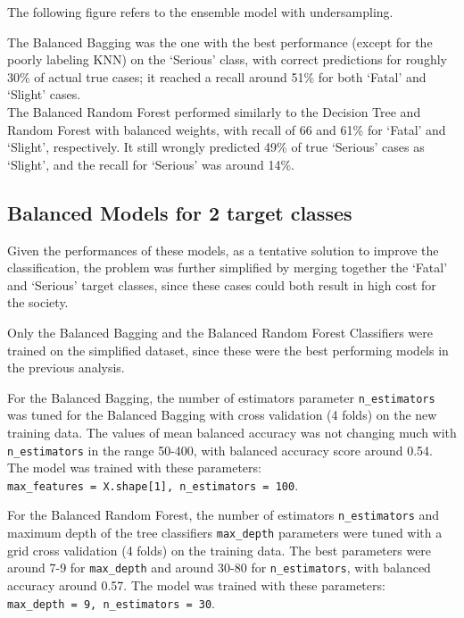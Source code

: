 \documentclass[11pt]{article}
\begin{document}
The following figure refers to the ensemble model with undersampling.

    \begin{center}
    \end{center}

The Balanced Bagging was the one with the best performance (except for the poorly labeling KNN) on the `Serious' class, with correct predictions for roughly 30\% of actual true cases; it reached a recall around 51\% for both `Fatal' and `Slight' cases.\\
The Balanced Random Forest performed similarly to the Decision Tree and Random Forest with balanced weights, with recall of 66 and 61\% for `Fatal' and `Slight', respectively. It still wrongly predicted 49\% of true `Serious' cases as `Slight', and the recall for `Serious' was around 14\%.

    \hypertarget{balanced-models-for-2-target-classes}{%
\subsection{Balanced Models for 2 target classes}\label{balanced-models-for-2-target-classes}}

Given the performances of these models, as a tentative solution to improve the classification, the problem was further simplified by merging together the `Fatal' and `Serious' target classes, since these cases could both result in high cost for the society.

Only the Balanced Bagging and the Balanced Random Forest Classifiers were trained on the simplified dataset, since these were the best performing models in the previous analysis.

For the Balanced Bagging, the number of estimators parameter \texttt{n\_estimators} was tuned for the Balanced Bagging with cross validation (4 folds) on the new training data. The values of mean balanced accuracy was not changing much with \texttt{n\_estimators} in the range 50-400, with balanced accuracy score around 0.54. The model was trained with these parameters:\\
\texttt{max\_features = X.shape[1], n\_estimators = 100}.

For the Balanced Random Forest, the number of estimators \texttt{n\_estimators} and maximum depth of the tree classifiers \texttt{max\_depth} parameters were tuned with a grid cross validation (4 folds) on the training data. The best parameters were around 7-9 for \texttt{max\_depth} and around 30-80 for \texttt{n\_estimators}, with balanced accuracy around 0.57. The model was trained with these parameters:\\
\texttt{max\_depth = 9, n\_estimators = 30}.
\end{document}

